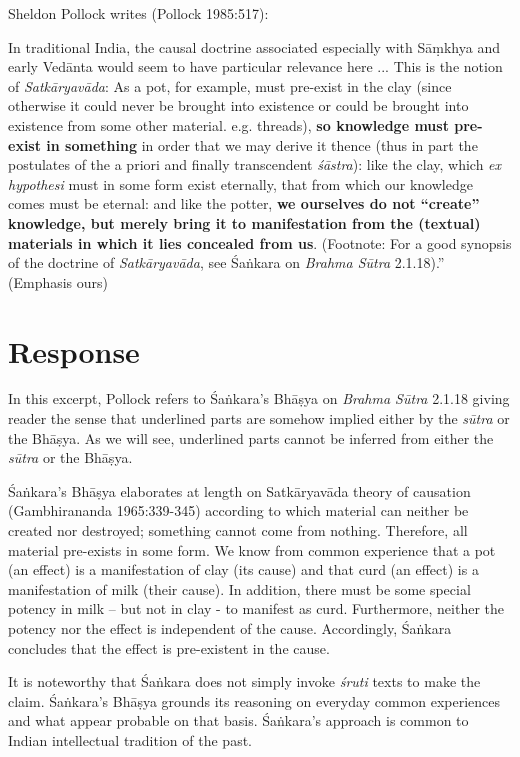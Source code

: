 Sheldon Pollock writes (Pollock 1985:517):
\begin{myquote}
In traditional India, the causal doctrine associated especially with Sāṃkhya and early Vedānta would seem to have particular relevance here ... This is the notion of \textit{Satkāryavāda}: As a pot, for example, must pre-exist in the clay (since otherwise it could never be brought into existence or could be brought into existence from some other material. e.g.  threads), \textbf{so knowledge must pre-exist in something} in order that we may derive it thence (thus in part the postulates of the a priori and finally transcendent \textit{śāstra}): like the clay, which \textit{ex hypothesi} must in some form exist eternally, that from which our knowledge comes must be eternal: and like the potter, \textbf{we ourselves do not ``create'' knowledge, but merely bring it to manifestation from the (textual) materials in which it lies concealed from us}. (Footnote: For a good synopsis of the doctrine of \textit{Satkāryavāda}, see Śaṅkara on \textit{Brahma Sūtra} 2.1.18).'' (Emphasis ours) 
\end{myquote}

\section*{Response}

In this excerpt, Pollock refers to Śaṅkara's Bhāṣya on {\sl Brahma Sūtra} 2.1.18 giving reader the sense that underlined parts are somehow implied either by the {\sl sūtra} or the Bhāṣya.  As we will see, underlined parts cannot be inferred from either the {\sl sūtra} or the Bhāṣya.

Śaṅkara's Bhāṣya elaborates at length on Satkāryavāda theory of causation (Gambhirananda 1965:339-345) according to which material can neither be created nor destroyed; something cannot come from nothing. Therefore, all material pre-exists in some form.  We know from common experience that a pot (an effect) is a manifestation of clay (its cause) and that curd (an effect) is a manifestation of milk (their cause). In addition, there must be some special potency in milk -- but not in clay - to manifest as curd.  Furthermore, neither the potency nor the effect is independent of the cause.  Accordingly, Śaṅkara concludes that the effect is pre-existent in the cause.

It is noteworthy that Śaṅkara does not simply invoke {\sl śruti} texts to make the claim.  Śaṅkara's Bhāṣya grounds its reasoning on everyday common experiences and what appear probable on that basis.  Śaṅkara's approach is common to Indian intellectual tradition of the past.

